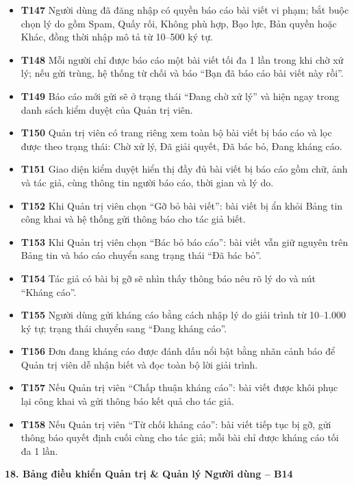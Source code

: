 \documentclass[11pt,a4paper]{article}
\begin{document}
\begin{itemize}[leftmargin=0.9cm, label=$\bullet$, itemsep=2pt, topsep=4pt]
    \item \textbf{T147} Người dùng đã đăng nhập có quyền báo cáo bài viết vi phạm; bắt buộc chọn lý do gồm Spam, Quấy rối, Không phù hợp, Bạo lực, Bản quyền hoặc Khác, đồng thời nhập mô tả từ 10--500 ký tự.
    \item \textbf{T148} Mỗi người chỉ được báo cáo một bài viết tối đa 1 lần trong khi chờ xử lý; nếu gửi trùng, hệ thống từ chối và báo ``Bạn đã báo cáo bài viết này rồi''.
    \item \textbf{T149} Báo cáo mới gửi sẽ ở trạng thái ``Đang chờ xử lý'' và hiện ngay trong danh sách kiểm duyệt của Quản trị viên.
    \item \textbf{T150} Quản trị viên có trang riêng xem toàn bộ bài viết bị báo cáo và lọc được theo trạng thái: Chờ xử lý, Đã giải quyết, Đã bác bỏ, Đang kháng cáo.
    \item \textbf{T151} Giao diện kiểm duyệt hiển thị đầy đủ bài viết bị báo cáo gồm chữ, ảnh và tác giả, cùng thông tin người báo cáo, thời gian và lý do.
    \item \textbf{T152} Khi Quản trị viên chọn ``Gỡ bỏ bài viết'': bài viết bị ẩn khỏi Bảng tin công khai và hệ thống gửi thông báo cho tác giả biết.
    \item \textbf{T153} Khi Quản trị viên chọn ``Bác bỏ báo cáo'': bài viết vẫn giữ nguyên trên Bảng tin và báo cáo chuyển sang trạng thái ``Đã bác bỏ''.
    \item \textbf{T154} Tác giả có bài bị gỡ sẽ nhìn thấy thông báo nêu rõ lý do và nút ``Kháng cáo''.
    \item \textbf{T155} Người dùng gửi kháng cáo bằng cách nhập lý do giải trình từ 10--1.000 ký tự; trạng thái chuyển sang ``Đang kháng cáo''.
    \item \textbf{T156} Đơn đang kháng cáo được đánh dấu nổi bật bằng nhãn cảnh báo để Quản trị viên dễ nhận biết và đọc toàn bộ lời giải trình.
    \item \textbf{T157} Nếu Quản trị viên ``Chấp thuận kháng cáo'': bài viết được khôi phục lại công khai và gửi thông báo kết quả cho tác giả.
    \item \textbf{T158} Nếu Quản trị viên ``Từ chối kháng cáo'': bài viết tiếp tục bị gỡ, gửi thông báo quyết định cuối cùng cho tác giả; mỗi bài chỉ được kháng cáo tối đa 1 lần.
\end{itemize}
\smallskip
\noindent\textbf{18. Bảng điều khiển Quản trị \& Quản lý Người dùng -- B14}
\end{document}
